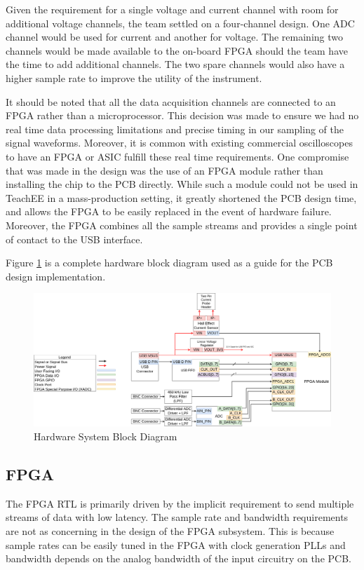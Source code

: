 \documentclass[letterpaper,11pt]{article}
\begin{document}
Given the requirement for a single voltage and current channel with room for
additional voltage channels, the team settled on a four-channel design. One ADC
channel would be used for current and another for voltage. The remaining two
channels would be made available to the on-board FPGA should the team have the
time to add additional channels. The two spare channels would also have a higher
sample rate to improve the utility of the instrument.

It should be noted that all the data acquisition channels are connected to an
FPGA rather than a microprocessor. This decision was made to ensure we had no
real time data processing limitations and precise timing in our sampling of the
signal waveforms. Moreover, it is common with existing commercial oscilloscopes
to have an FPGA or ASIC fulfill these real time requirements. One compromise
that was made in the design was the use of an FPGA module rather than installing
the chip to the PCB directly. While such a module could not be used in TeachEE
in a mass-production setting, it greatly shortened the PCB design time, and
allows the FPGA to be easily replaced in the event of hardware failure.
Moreover, the FPGA combines all the sample streams and provides a single point
of contact to the USB interface.

Figure \ref{fig:hw-block-diagram} is a complete hardware block diagram used as a
guide for the PCB design implementation.

\begin{figure}[H]
  \centering
  \includegraphics[width=\textwidth]{../../misc/TeachEE-System-Diagram-Hardware.png}
  \caption{Hardware System Block Diagram}
  \label{fig:hw-block-diagram}
\end{figure}

\subsection{FPGA} %
The FPGA RTL is primarily driven by the implicit requirement to send multiple
streams of data with low latency. The sample rate and bandwidth requirements are
not as concerning in the design of the FPGA subsystem. This is because sample
rates can be easily tuned in the FPGA with clock generation PLLs and bandwidth
depends on the analog bandwidth of the input circuitry on the PCB.
\end{document}
